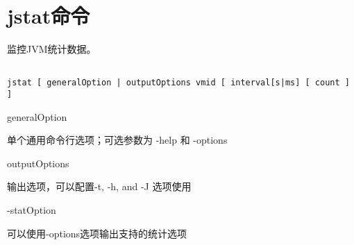 \section{jstat命令}
\label{chap:tools_jstat}

监控JVM统计数据。


\begin{lstlisting}[language=cshell]

jstat [ generalOption | outputOptions vmid [ interval[s|ms] [ count ] ]

\end{lstlisting}


generalOption

单个通用命令行选项；可选参数为 -help 和 -options


outputOptions

输出选项，可以配置-t, -h, and -J 选项使用



-statOption

可以使用-options选项输出支持的统计选项


